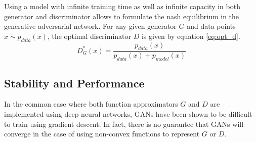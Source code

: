 Using a model with infinite training time as well as infinite capacity in both generator and discriminator allows to formulate the nash equilibrium in the generative adversarial network.
For any given generator $G$ and data points $x \sim p_{data}(x)$, the optimal discriminator $D$ is given by equation \ref{eq:opt_d}.
\begin{equation}
  \label{eq:opt_d}
  D_G^*(x) = \frac{p_{data}(x)}{p_{data}(x) + p_{model}(x)}
\end{equation}



\newpage

\subsection{Stability and Performance}
\label{sub:gan_stability}
In the common case where both function approximators $G$ and $D$ are implemented using deep neural networks, GANs have been shown to be difficult to train using gradient descent.
In fact, there is no guarantee that GANs will converge in the case of using non-convex functions to represent $G$ or $D$.

